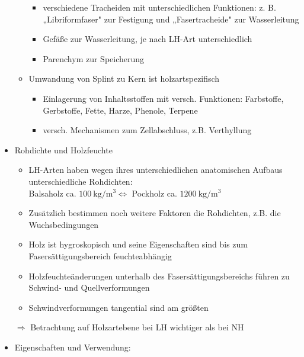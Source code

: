 \documentclass[fleqn,twoside]{article}
\begin{document}
\begin{itemize}
\begin{itemize}
                        \begin{itemize}
                            \item  verschiedene Tracheiden mit unterschiedlichen Funktionen:
                            z. B. „Libriformfaser" zur Festigung und
                            „Fasertracheide" zur Wasserleitung
                            \item  Gefäße zur Wasserleitung, je nach LH-Art unterschiedlich
                            \item  Parenchym zur Speicherung
                        \end{itemize}
                    \item Umwandung von Splint zu Kern ist holzartspezifisch
                        \begin{itemize}
                            \item  Einlagerung von Inhaltsstoffen mit versch. Funktionen: Farbstoffe, Gerbstoffe, Fette, Harze, Phenole, Terpene
                            \item versch. Mechanismen zum Zellabschluss, z.B. Verthyllung
                        \end{itemize}
                \end{itemize}
            \item Rohdichte und Holzfeuchte
                \begin{itemize}
                    \item LH-Arten haben wegen ihres unterschiedlichen anatomischen Aufbaus unterschiedliche Rohdichten:\\
                    Balsaholz ca. $100 \mathrm{~kg} / \mathrm{m}^3 \Longleftrightarrow$ Pockholz ca. $1200 \mathrm{~kg} / \mathrm{m}^3$
                    \item Zusätzlich bestimmen noch weitere Faktoren die Rohdichten, z.B. die Wuchsbedingungen
                    \item Holz ist hygroskopisch und seine Eigenschaften sind bis zum Fasersättigungsbereich feuchteabhängig
                    \item Holzfeuchteänderungen unterhalb des Fasersättigungsbereichs führen zu Schwind- und Quellverformungen
                    \item Schwindverformungen tangential sind am größten
                \end{itemize}
                    $\Rightarrow$ Betrachtung auf Holzartebene bei LH wichtiger als bei NH
            \item Eigenschaften und Verwendung:

\end{itemize}
\end{document}
